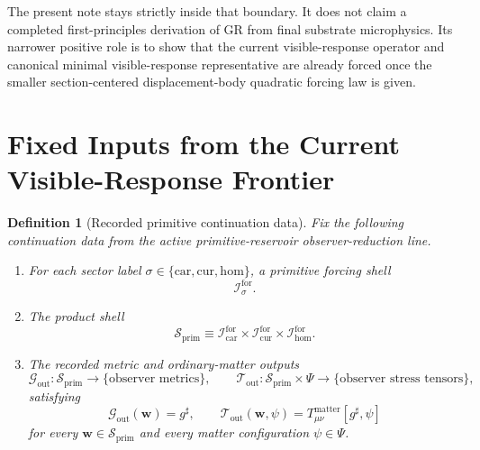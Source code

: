 \documentclass[11pt]{article}
\newcommand{\CompletedMetric}{g^{\sharp}}
\newcommand{\MatterSpace}{\Psi}
\newcommand{\Car}{\mathrm{car}}
\newcommand{\Cur}{\mathrm{cur}}
\newcommand{\Hom}{\mathrm{hom}}
\newcommand{\ForSpace}[1]{\mathcal I_{#1}^{\mathrm{for}}}
\newcommand{\PrimShell}{\mathcal S_{\mathrm{prim}}}
\newcommand{\MetricOut}{\mathscr G_{\mathrm{out}}}
\newcommand{\MatterOut}{\mathscr T_{\mathrm{out}}}
\newtheorem{definition}{Definition}
\begin{document}
The present note stays strictly inside that boundary. It does not claim a completed first-principles derivation of GR from final substrate microphysics. Its narrower positive role is to show that the current visible-response operator and canonical minimal visible-response representative are already forced once the smaller section-centered displacement-body quadratic forcing law is given.

\section{Fixed Inputs from the Current Visible-Response Frontier}

\begin{definition}[Recorded primitive continuation data]
\label{def:fixed}
Fix the following continuation data from the active primitive-reservoir observer-reduction line.
\begin{enumerate}
    \item For each sector label \(\sigma\in\{\Car,\Cur,\Hom\}\), a primitive forcing shell
    \[
    \ForSpace{\sigma}.
    \]
    \item The product shell
    \[
    \PrimShell
    \equiv
    \ForSpace{\Car}\times \ForSpace{\Cur}\times \ForSpace{\Hom}.
    \]
    \item The recorded metric and ordinary-matter outputs
    \[
    \MetricOut:\PrimShell\to\{\text{observer metrics}\},
    \qquad
    \MatterOut:\PrimShell\times\MatterSpace\to\{\text{observer stress tensors}\},
    \]
    satisfying
    \begin{equation}
    \MetricOut(\mathbf w)=\CompletedMetric,
    \qquad
    \MatterOut(\mathbf w,\psi)
    =
    T_{\mu\nu}^{\mathrm{matter}}[\CompletedMetric,\psi]
    \label{eq:fixedoutputs}
    \end{equation}
    for every \(\mathbf w\in\PrimShell\) and every matter configuration \(\psi\in\MatterSpace\).
\end{enumerate}
\end{definition}
\end{document}
